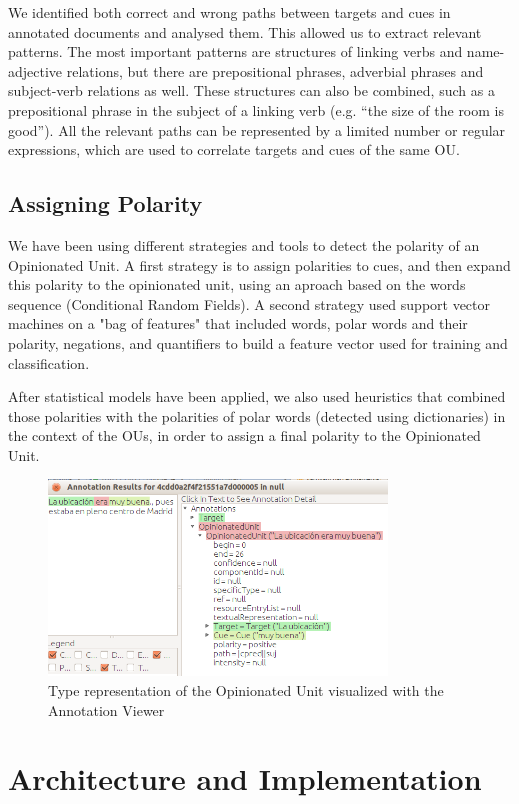 \documentclass{llncs}
\begin{document}
We identified both correct and wrong paths between targets and cues in annotated documents and analysed them. This allowed us to extract relevant patterns. The most important patterns are structures of linking verbs and name-adjective relations, but there are prepositional phrases, adverbial phrases and subject-verb relations as well. These structures can also be combined, such as a prepositional phrase in the subject of a linking verb (e.g. “the size of the room is good”). All the relevant paths can be represented by a limited number or regular expressions, which are used to correlate targets and cues of the same OU.

\subsection{Assigning Polarity}

We have been using different strategies  and tools to detect the polarity of an Opinionated Unit. A first strategy is to assign polarities to cues, and then expand this polarity to the opinionated unit, using an aproach based on the words sequence (Conditional Random Fields). A second strategy used support vector machines on a "bag of features" that included words, polar words and their polarity, negations, and quantifiers to build a feature vector used for training and classification. 

After statistical models have been applied, we also used heuristics that combined those polarities with the polarities of polar words (detected using dictionaries) in the context of the OUs, in order to assign a final polarity to the Opinionated Unit.

\begin{figure}[ht]
\centering
\includegraphics[width=9cm]{bookingOU.png}
\caption{Type representation of the Opinionated Unit visualized with the Annotation Viewer}
\label{fig:xmi}
\end{figure}

\section{Architecture and Implementation}
\end{document}
